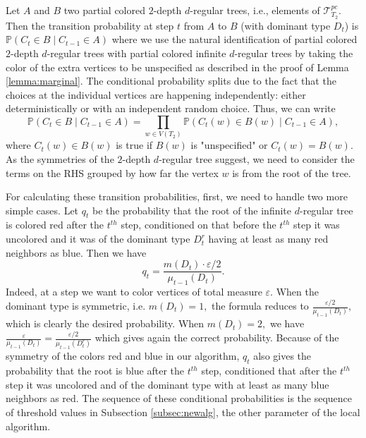 \documentclass{article}
\theoremstyle{definition}
\newcommand{\eps}{\varepsilon}
\newcommand{\bbP}{\mathbb P}
\begin{document}
Let $A$ and $B$ two partial colored $2$-depth $d$-regular trees, i.e., elements of $\mathcal T^{pc}_{T_2}$. Then the transition probability at step $t$ from $A$ to $B$ (with dominant type $D_t$) is $\bbP(C_t\in B\mid C_{t-1}\in A)$ where we use the natural identification of partial colored $2$-depth $d$-regular trees with partial colored infinite $d$-regular trees by taking the color of the extra vertices to be unspecified as described in the proof of Lemma \ref{lemma:marginal}. The conditional probability splits due to the fact that the choices at the individual vertices are happening independently: either deterministically or with an independent random choice. Thus, we can write
\begin{equation}
 \label{eq:transition_probability}
 \bbP(
C_t\in B\mid C_{t-1}\in A)=\prod_{w\in V(T_2)}\bbP(C_t(w)\in B(w)\mid C_{t-1}\in A),
\end{equation}
where $C_t(w)\in B(w)$ is true if $B(w)$ is "unspecified" or $C_t(w)=B(w)$. As the symmetries of the $2$-depth $d$-regular tree suggest, we need to consider the terms on the RHS grouped by how far the vertex $w$ is from the root of the tree.

For calculating these transition probabilities, first, we need to handle two more simple cases. Let $q_t$ be the probability that the root of the infinite $d$-regular tree is colored red after the $t^{th}$ step, conditioned on that before the $t^{th}$ step it was uncolored and it was of the dominant type $D_t^r$ having at least as many red neighbors as blue. Then we have 
$$q_t=\frac{m(D_t)\cdot\eps/2}{\mu_{t-1}(D_t)}.$$
Indeed, at a step we want to color vertices of total measure $\eps.$ When the dominant type is symmetric, i.e. $m(D_t)=1,$ the formula reduces to $\frac{\eps/2}{\mu_{t-1}(D_t)},$ which is clearly the desired probability. When $m(D_t)=2,$ we have $\frac{\eps}{\mu_{t-1}(D_t)}=\frac{\eps/2}{\mu_{t-1}(D_t^r)}$ which gives again the correct probability. Because of the symmetry of the colors red and blue in our algorithm, $q_t$ also gives the probability that the root is blue after the $t^{th}$ step, conditioned that after the $t^{th}$ step it was uncolored and of the dominant type with at least as many blue neighbors as red. The sequence of these conditional probabilities is the sequence of threshold values in Subsection \ref{subsec:newalg}, the other parameter of the local algorithm.
\end{document}
